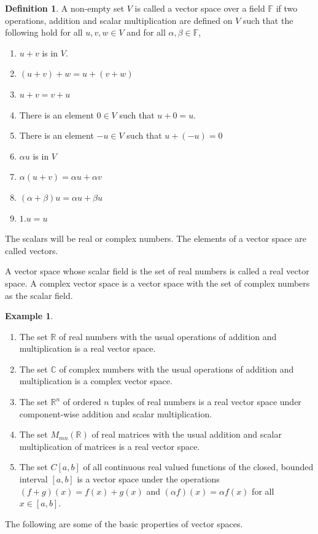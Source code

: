 \documentclass[11pt,a4paper]{article}
\theoremstyle{definition}
\newtheorem{defn}[thm]{Definition}
\newtheorem{exa}[thm]{Example}
\begin{document}
\begin{defn}
A non-empty set $V$ is called a vector space over a field $\mathbb{F}$ if two operations, addition and scalar multiplication are defined on $V$ such that the following hold for all $u,v,w\in V$ and for all $\alpha, \beta \in \mathbb{F}$,
\begin{enumerate}
\item[i.] $u+v$ is in $V$.
\item[ii.] $(u+v)+w=u+(v+w)$
\item[iii.] $u+v=v+u$
\item[iv.] There is an element $0\in V$ such that $u+0=u$.
\item[v.] There is an element $-u\in V$ such that $u+(-u)=0$
\item[vi.] $\alpha u$ is in $V$
\item[vii.] $\alpha (u+v)=\alpha u+\alpha v$
\item[viii.] $(\alpha +\beta ) u=\alpha u+\beta u$
\item[xi.] $1.u=u$
\end{enumerate}
The scalars will be real or complex numbers. The elements of a vector space are called vectors.

A vector space whose scalar field is the set of real numbers is called a real vector space. A complex vector space is a vector space with the set of complex numbers as the scalar field.
\end{defn}

\begin{exa}
\begin{enumerate}
\item The set $\mathbb{R}$ of real numbers with the usual operations of addition and multiplication is a real vector space.
\item The set $\mathbb{C}$ of complex numbers with the usual operations of addition and multiplication is a complex vector space.
\item The set $\mathbb{R}^n$ of ordered $n$ tuples of real numbers is a real vector space under component-wise addition and scalar multiplication.
\item The set $M_{mn}(\mathbb{R})$ of real matrices with the usual addition and scalar multiplication of matrices is a real vector space.
\item The set $C[a,b]$ of all continuous real valued functions of the closed, bounded interval $[a,b]$ is a vector space under the operations $(f+g)(x)=f(x)+g(x)$ and $(\alpha f)(x)=\alpha f(x)$ for all $x\in [a,b]$.
\end{enumerate}
\end{exa}
The following are some of the basic properties of vector spaces.
\end{document}
